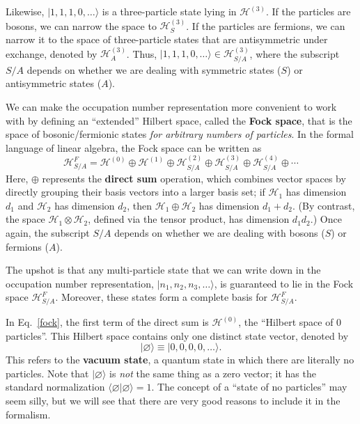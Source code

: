 \documentclass[pra,12pt]{revtex4}
\begin{document}
Likewise, $|1,1,1,0,\dots\rangle$ is a three-particle state lying in
$\mathscr{H}^{(3)}$.  If the particles are bosons, we can narrow the
space to $\mathscr{H}^{(3)}_S$.  If the particles are fermions, we can
narrow it to the space of three-particle states that are antisymmetric
under exchange, denoted by $\mathscr{H}^{(3)}_A$.  Thus,
$|1,1,1,0,\dots\rangle \in \mathscr{H}^{(3)}_{S/A}$, where the
subscript $S/A$ depends on whether we are dealing with symmetric
states ($S$) or antisymmetric states ($A$).

We can make the occupation number representation more convenient to
work with by defining an ``extended'' Hilbert space, called the
\textbf{Fock space}, that is the space of bosonic/fermionic states
\textit{for arbitrary numbers of particles}.  In the formal language
of linear algebra, the Fock space can be written as
\begin{equation}
  \mathscr{H}_{S/A}^F = \mathscr{H}^{(0)} \oplus \mathscr{H}^{(1)} \oplus \mathscr{H}^{(2)}_{S/A} \oplus \mathscr{H}^{(3)}_{S/A} \oplus \mathscr{H}^{(4)}_{S/A} \oplus \cdots
  \label{fock}
\end{equation}
Here, $\oplus$ represents the \textbf{direct sum} operation, which
combines vector spaces by directly grouping their basis vectors into a
larger basis set; if $\mathscr{H}_1$ has dimension $d_1$ and
$\mathscr{H}_2$ has dimension $d_2$, then
$\mathscr{H}_1\oplus\mathscr{H}_2$ has dimension $d_1+d_2$.  (By
contrast, the space $\mathscr{H}_1\otimes\mathscr{H}_2$, defined via
the tensor product, has dimension $d_1d_2$.)  Once again, the
subscript $S/A$ depends on whether we are dealing with bosons ($S$) or
fermions ($A$).

The upshot is that any multi-particle state that we can write down in
the occupation number representation, $|n_1,n_2,n_3,\dots\rangle$, is
guaranteed to lie in the Fock space $\mathscr{H}^{F}_{S/A}$.
Moreover, these states form a complete basis for
$\mathscr{H}^{F}_{S/A}$.

In Eq.~\eqref{fock}, the first term of the direct sum is
$\mathscr{H}^{(0)}$, the ``Hilbert space of 0 particles''.  This
Hilbert space contains only one distinct state vector, denoted by
\begin{equation}
  |\varnothing\rangle \equiv |0,0,0,0,\dots\rangle.
\end{equation}
This refers to the \textbf{vacuum state}, a quantum state in which
there are literally no particles.  Note that $|\varnothing\rangle$ is
\textit{not} the same thing as a zero vector; it has the standard
normalization $\langle\varnothing|\varnothing\rangle = 1$.  The
concept of a ``state of no particles'' may seem silly, but we will see
that there are very good reasons to include it in the formalism.
\end{document}

